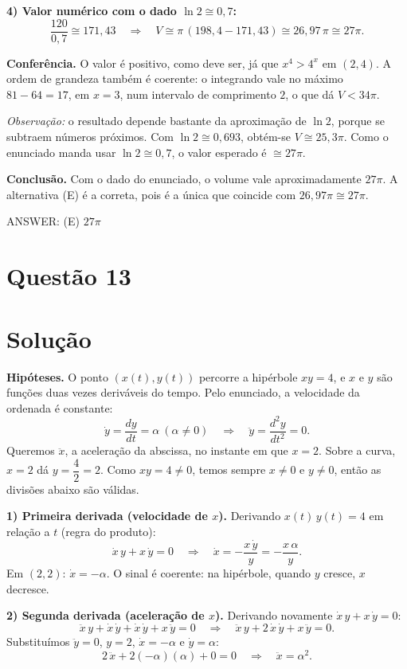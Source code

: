 \documentclass{article}%
\begin{document}
\textbf{4) Valor numérico com o dado $\ln 2\cong 0{,}7$:}
\[
\frac{120}{0{,}7}\cong 171{,}43
\quad\Longrightarrow\quad
V\cong\pi\,(198{,}4-171{,}43)\cong 26{,}97\,\pi\cong 27\pi .
\]

\textbf{Conferência.} O valor é positivo, como deve ser, já que $x^4>4^x$ em $(2,4)$. A ordem de grandeza também é coerente: o integrando vale no máximo $81-64=17$, em $x=3$, num intervalo de comprimento $2$, o que dá $V<34\pi$.

\textit{Observação:} o resultado depende bastante da aproximação de $\ln 2$, porque se subtraem números próximos. Com $\ln 2\cong 0{,}693$, obtém-se $V\cong 25{,}3\pi$. Como o enunciado manda usar $\ln 2\cong 0{,}7$, o valor esperado é $\cong 27\pi$.

\textbf{Conclusão.} Com o dado do enunciado, o volume vale aproximadamente $27\pi$. A alternativa (E) é a correta, pois é a única que coincide com $26{,}97\pi\cong 27\pi$.

ANSWER: (E) $27\pi$%
\newpage%
\section*{Questão 13}

\section*{Solução}

\textbf{Hipóteses.} O ponto $(x(t),y(t))$ percorre a hipérbole $xy=4$, e $x$ e $y$ são funções duas vezes deriváveis do tempo. Pelo enunciado, a velocidade da ordenada é constante:
\[
\dot y=\frac{dy}{dt}=\alpha \ (\alpha\neq 0) \quad\Longrightarrow\quad \ddot y=\frac{d^2y}{dt^2}=0 .
\]
Queremos $\ddot x$, a aceleração da abscissa, no instante em que $x=2$. Sobre a curva, $x=2$ dá $y=\dfrac{4}{2}=2$. Como $xy=4\neq 0$, temos sempre $x\neq 0$ e $y\neq 0$, então as divisões abaixo são válidas.

\textbf{1) Primeira derivada (velocidade de $x$).} Derivando $x(t)\,y(t)=4$ em relação a $t$ (regra do produto):
\[
\dot x\,y+x\,\dot y=0 \quad\Longrightarrow\quad \dot x=-\frac{x\,\dot y}{y}=-\frac{x\,\alpha}{y}.
\]
Em $(2,2)$: $\dot x=-\alpha$. O sinal é coerente: na hipérbole, quando $y$ cresce, $x$ decresce.

\textbf{2) Segunda derivada (aceleração de $x$).} Derivando novamente $\dot x\,y+x\,\dot y=0$:
\[
\ddot x\,y+\dot x\,\dot y+\dot x\,\dot y+x\,\ddot y=0
\quad\Longrightarrow\quad
\ddot x\,y+2\,\dot x\,\dot y+x\,\ddot y=0 .
\]
Substituímos $\ddot y=0$, $y=2$, $\dot x=-\alpha$ e $\dot y=\alpha$:
\[
2\,\ddot x+2(-\alpha)(\alpha)+0=0 \quad\Longrightarrow\quad \ddot x=\alpha^2 .
\]
\end{document}
